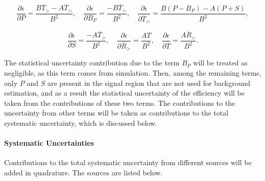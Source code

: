 $$\frac{\partial \epsilon}{\partial P} = \frac{B \overline{T}_> - A \overline{T}_> }{B^2},
	\quad
	\frac{\partial \epsilon}{\partial B_P} = \frac{- B \overline{T}_> }{B^2},
	\quad
	\frac{\partial \epsilon}{\partial \overline{T}_>} = \frac{B (P - B_P) - A(P + S) }{B^2},
$$

$$\frac{\partial \epsilon}{\partial S} = \frac{- A \overline{T}_> }{B^2},
	\quad
	\frac{\partial \epsilon}{\partial \overline{R}_>} = \frac{AT }{B^2},
	\quad
	\frac{\partial \epsilon}{\partial \overline{T}} = \frac{A \overline{R}_> }{B^2}.
$$

The statistical uncertainty contribution due to the term $B_P$ will be treated
as negligible, as this term comes from simulation. Then, among the remaining
terms, only $P$ and $S$ are present in the signal region that are not used for
background estimation, and as a result the statistical uncertainty of the
efficiency will be taken from the contributions of these two terms. The
contributions to the uncertainty from other terms will be taken as
contributions to the total systematic uncertainty, which is discussed below.



\paragraph{Systematic Uncertainties} Contributions to the total systematic
uncertainty from different sources will be added in quadrature. The sources are
listed below.

